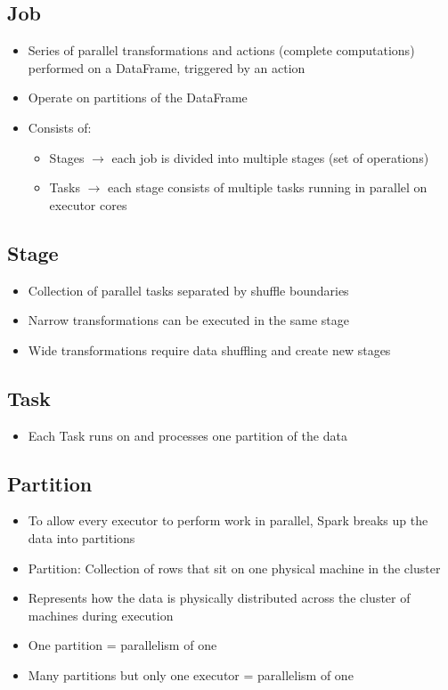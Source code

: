 \documentclass[11pt]{scrartcl}
\begin{document}
\subsection{Job}
\begin{itemize}
	\item Series of parallel transformations and actions (complete computations) performed on a DataFrame, triggered by an action
	\item Operate on partitions of the DataFrame
	\item Consists of:
	\begin{itemize}
		\item Stages $ \to $ each job is divided into multiple stages (set of operations)
		\item Tasks $ \to $ each stage consists of multiple tasks running in parallel on executor cores
	\end{itemize}
\end{itemize}

\subsection{Stage}
\begin{itemize}
	\item Collection of parallel tasks separated by shuffle boundaries
	\item Narrow transformations can be executed in the same stage
	\item Wide transformations require data shuffling and create new stages
\end{itemize}

\subsection{Task}
\begin{itemize}
	\item Each Task runs on and processes one partition of the data
\end{itemize}

\subsection{Partition}
\begin{itemize}
	\item To allow every executor to perform work in parallel, Spark breaks up the data into partitions
	\item Partition: Collection of rows that sit on one physical machine in the cluster
	\item Represents how the data is physically distributed across the cluster of machines during execution
	\item One partition = parallelism of one
	\item Many partitions but only one executor = parallelism of one
\end{itemize}
\end{document}
